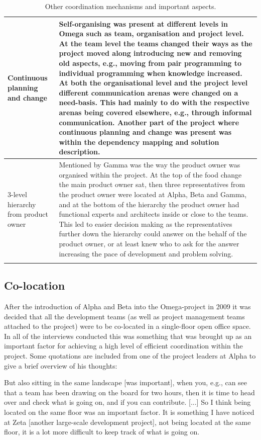 \begin{center}
\begin{longtable}{| p{6cm} | p{9cm} |}
    Continuous planning and change & Self-organising was present at different levels in Omega such as team, organisation and project level. At the team level the teams changed their ways as the project moved along introducing new and removing old aspects, e.g., moving from pair programming to individual programming when knowledge increased. At both the organisational level and the project level different communication arenas were changed on a need-basis. This had mainly to do with the respective arenas being covered elsewhere, e.g., through informal communication. Another part of the project where continuous planning and change was present was within the dependency mapping and solution description. \\ \hline
    3-level hierarchy from product owner & Mentioned by Gamma was the way the product owner was organised within the project. At the top of the food change the main product owner sat, then three representatives from the product owner were located at Alpha, Beta and Gamma, and at the bottom of the hierarchy the product owner had functional experts and architects inside or close to the teams. This led to easier decision making as the representatives further down the hierarchy could answer on the behalf of the product owner, or at least knew who to ask for the answer increasing the pace of development and problem solving. \\ \hline

    \caption{Other coordination mechanisms and important aspects.}
    \label{ocmaia}
    \end{longtable}
\end{center}

\subsection{Co-location}

After the introduction of Alpha and Beta into the Omega-project in 2009 it was decided that all the development teams (as well as project management teams attached to the project) were to be co-located in a single-floor open office space. In all of the interviews conducted this was something that was brought up as an important factor for achieving a high level of efficient coordination within the project. Some quotations are included from one of the project leaders at Alpha to give a brief overview of his thoughts:

\begin{fancyquotes}
But also sitting in the same landscape [was important], when you, e.g., can see that a team has been drawing on the board for two hours, then it is time to head over and check what is going on, and if you can contribute. [...] So I think being located on the same floor was an important factor. It is something I have noticed at Zeta [another large-scale development project], not being located at the same floor, it is a lot more difficult to keep track of what is going on. 
\end{fancyquotes}

